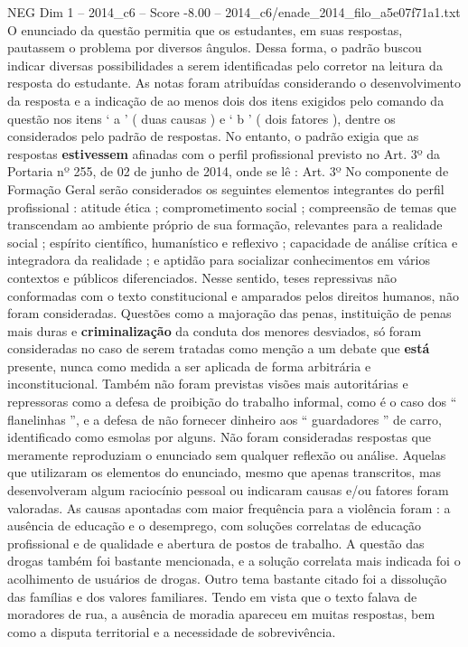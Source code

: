 \begin{textsample}{NEG Dim 1 – 2014\_c6 – Score -8.00 – 2014\_c6/enade\_2014\_filo\_a5e07f71a1.txt}
O enunciado da questão permitia que os estudantes, em suas respostas, pautassem o problema por diversos ângulos.
Dessa forma, o padrão buscou indicar diversas possibilidades a serem identificadas pelo corretor na leitura da resposta do estudante.
As notas foram atribuídas considerando o desenvolvimento da resposta e a indicação de ao menos dois dos itens exigidos pelo comando da questão nos itens ‘ a ’ ( duas causas ) e ‘ b ’ ( dois fatores ), dentre os considerados pelo padrão de respostas.
No entanto, o padrão exigia que as respostas \textbf{estivessem} afinadas com o perfil profissional previsto no Art. 3º da Portaria nº 255, de 02 de junho de 2014, onde se lê : Art. 3º No componente de Formação Geral serão considerados os seguintes elementos integrantes do perfil profissional : atitude ética ; comprometimento social ; compreensão de temas que transcendam ao ambiente próprio de sua formação, relevantes para a realidade social ; espírito científico, humanístico e reflexivo ; capacidade de análise crítica e integradora da realidade ; e aptidão para socializar conhecimentos em vários contextos e públicos diferenciados.
Nesse sentido, teses repressivas não conformadas com o texto constitucional e amparados pelos direitos humanos, não foram consideradas.
Questões como a majoração das penas, instituição de penas mais duras e \textbf{criminalização} da conduta dos menores desviados, só foram consideradas no caso de serem tratadas como menção a um debate que \textbf{está} presente, nunca como medida a ser aplicada de forma arbitrária e inconstitucional.
Também não foram previstas visões mais autoritárias e repressoras como a defesa de proibição do trabalho informal, como é o caso dos “ flanelinhas ”, e a defesa de não fornecer dinheiro aos “ guardadores ” de carro, identificado como esmolas por alguns.
Não foram consideradas respostas que meramente reproduziam o enunciado sem qualquer reflexão ou análise.
Aquelas que utilizaram os elementos do enunciado, mesmo que apenas transcritos, mas desenvolveram algum raciocínio pessoal ou indicaram causas e/ou fatores foram valoradas.
As causas apontadas com maior frequência para a violência foram : a ausência de educação e o desemprego, com soluções correlatas de educação profissional e de qualidade e abertura de postos de trabalho.
A questão das drogas também foi bastante mencionada, e a solução correlata mais indicada foi o acolhimento de usuários de drogas.
Outro tema bastante citado foi a dissolução das famílias e dos valores familiares.
Tendo em vista que o texto falava de moradores de rua, a ausência de moradia apareceu em muitas respostas, bem como a disputa territorial e a necessidade de sobrevivência.

\end{textsample}
